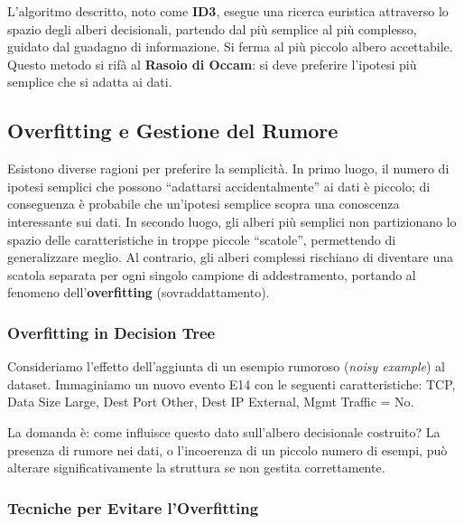 L'algoritmo descritto, noto come \textbf{ID3}, esegue una
ricerca euristica attraverso lo spazio degli alberi
decisionali, partendo dal più semplice al più complesso,
guidato dal guadagno di informazione. Si ferma al più
piccolo albero accettabile. Questo metodo si rifà al
\textbf{Rasoio di Occam}: si deve preferire l'ipotesi
più semplice che si adatta ai dati.

\subsection{Overfitting e Gestione del Rumore}

Esistono diverse ragioni per preferire la semplicità.
In primo luogo, il numero di ipotesi semplici che possono
``adattarsi accidentalmente'' ai dati è piccolo; di
conseguenza è probabile che un'ipotesi semplice scopra
una conoscenza interessante sui dati. In secondo luogo,
gli alberi più semplici non partizionano lo spazio delle
caratteristiche in troppe piccole ``scatole'', permettendo
di generalizzare meglio. Al contrario, gli alberi complessi
rischiano di diventare una scatola separata per ogni
singolo campione di addestramento, portando al fenomeno
dell'\textbf{overfitting} (sovraddattamento).

\subsubsection{Overfitting in Decision Tree}

Consideriamo l'effetto dell'aggiunta di un esempio rumoroso
(\textit{noisy example}) al dataset. Immaginiamo un nuovo
evento E14 con le seguenti caratteristiche: TCP, Data Size
Large, Dest Port Other, Dest IP External, Mgmt Traffic = No.

La domanda è: come influisce questo dato sull'albero
decisionale costruito? La presenza di rumore nei dati,
o l'incoerenza di un piccolo numero di esempi, può alterare
significativamente la struttura se non gestita correttamente.

\subsubsection{Tecniche per Evitare l'Overfitting}

